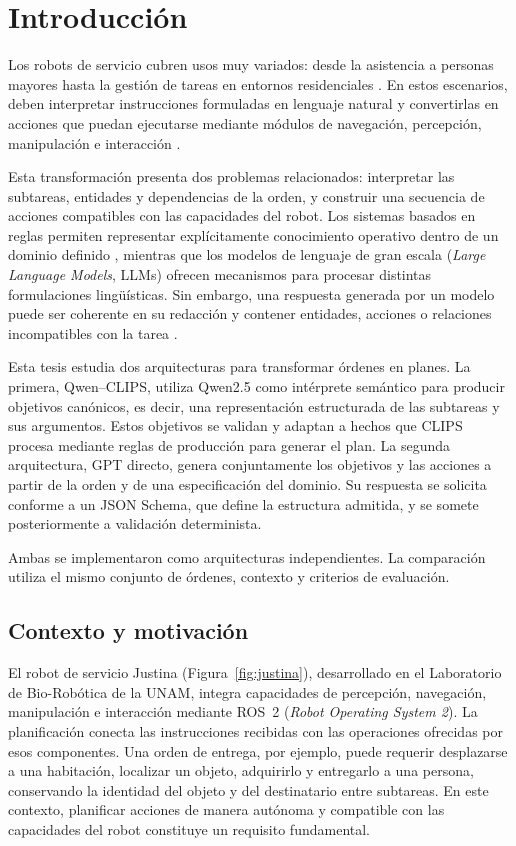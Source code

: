 \chapter{Introducción}

Los robots de servicio cubren usos muy variados: desde la asistencia a personas mayores hasta la gestión de tareas en entornos residenciales \cite{Murphy2019}. En estos escenarios, deben interpretar instrucciones formuladas en lenguaje natural y convertirlas en acciones que puedan ejecutarse mediante módulos de navegación, percepción, manipulación e interacción \cite{Russell2020}.

Esta transformación presenta dos problemas relacionados: interpretar las subtareas, entidades y dependencias de la orden, y construir una secuencia de acciones compatibles con las capacidades del robot. Los sistemas basados en reglas permiten representar explícitamente conocimiento operativo dentro de un dominio definido \cite{Giarratano2005}, mientras que los modelos de lenguaje de gran escala (\textit{Large Language Models}, LLMs) ofrecen mecanismos para procesar distintas formulaciones lingüísticas. Sin embargo, una respuesta generada por un modelo puede ser coherente en su redacción y contener entidades, acciones o relaciones incompatibles con la tarea \cite{Shi2023}.

Esta tesis estudia dos arquitecturas para transformar órdenes en planes. La primera, Qwen--CLIPS, utiliza Qwen2.5 como intérprete semántico para producir objetivos canónicos, es decir, una representación estructurada de las subtareas y sus argumentos. Estos objetivos se validan y adaptan a hechos que CLIPS procesa mediante reglas de producción para generar el plan. La segunda arquitectura, GPT directo, genera conjuntamente los objetivos y las acciones a partir de la orden y de una especificación del dominio. Su respuesta se solicita conforme a un JSON Schema, que define la estructura admitida, y se somete posteriormente a validación determinista.

Ambas se implementaron como arquitecturas independientes. La comparación utiliza el mismo conjunto de órdenes, contexto y criterios de evaluación.

\section{Contexto y motivación}

El robot de servicio Justina (Figura~\ref{fig:justina}), desarrollado en el Laboratorio de Bio-Robótica de la UNAM, integra capacidades de percepción, navegación, manipulación e interacción mediante ROS~2 (\textit{Robot Operating System 2}). La planificación conecta las instrucciones recibidas con las operaciones ofrecidas por esos componentes. Una orden de entrega, por ejemplo, puede requerir desplazarse a una habitación, localizar un objeto, adquirirlo y entregarlo a una persona, conservando la identidad del objeto y del destinatario entre subtareas. En este contexto, planificar acciones de manera autónoma y compatible con las capacidades del robot constituye un requisito fundamental.


